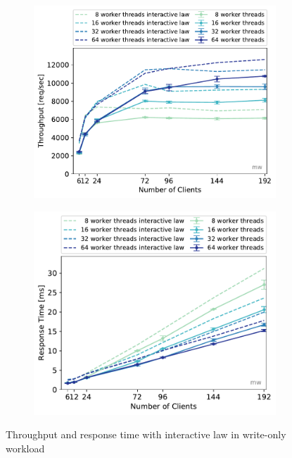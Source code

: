 \documentclass[11pt,a4paper]{article}
\begin{document}
\begin{figure}
	\begin{subfigure}[b]{.49\linewidth}
		\centering
		\includegraphics[width=\linewidth]{data/exp41_wo_tp_nc_w.pdf}
	\end{subfigure}\hfill
	\begin{subfigure}[b]{.49\linewidth}
		\centering
		\includegraphics[width=\linewidth]{data/exp41_wo_rt_nc_w.pdf}
	\end{subfigure}%
	\caption{Throughput and response time with interactive law in write-only workload}
\end{figure}
\end{document}
